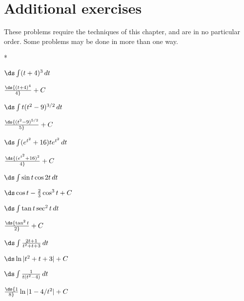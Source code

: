 \section{Additional exercises}{}{}
\nobreak
These problems require the techniques of this chapter, and are in no
particular order. Some problems may be done in more than one way.

\nobreak
\begin{exercises}*

\twocol

\begin{exercise} $\ds\int (t+4)^3\,dt$
\begin{answer} $\ds{(t+4)^4\over4}+C$
\end{answer}\end{exercise}

\begin{exercise} $\ds\int t(t^2-9)^{3/2}\,dt$
\begin{answer} $\ds{(t^2-9)^{5/2}\over5}+C$
\end{answer}\end{exercise}

\begin{exercise} $\ds\int (e^{t^2}+16)te^{t^2}\,dt$
\begin{answer} $\ds{(e^{t^2}+16)^2\over 4}+C$
\end{answer}\end{exercise}

\begin{exercise} $\ds\int \sin t\cos 2t\,dt$
\begin{answer} $\ds\cos t-{2\over3}\cos^3 t+C$
\end{answer}\end{exercise}

\begin{exercise} $\ds\int \tan t\sec^2t\,dt$
\begin{answer} $\ds{\tan^2 t\over 2}+C$
\end{answer}\end{exercise}

\begin{exercise} $\ds\int {2t+1\over t^2+t+3}\,dt$
\begin{answer} $\ds\ln|t^2+t+3|+C$
\end{answer}\end{exercise}

\begin{exercise} $\ds\int {1\over t(t^2-4)}\,dt$
\begin{answer} $\ds {1\over8} \ln|1-4/t^2|+C$
\end{answer}\end{exercise}


\end{exercises}
